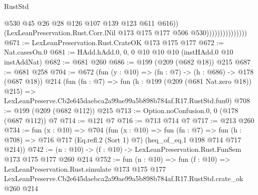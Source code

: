 \begin{lexlean}{RustStd}
\begin{coremodule}
                                    @530
                                    @45
                                    @26
                                    @28
                                    @126
                                    @107
                                    @139
                                    @123
                                    @611
                                    @616))
                                (LexLeanPreservation.Rust.Corr.lNil
                                  @173
                                  @175
                                  @177
                                  @506
                                  @530)))))))))))))))
@671 := LexLeanPreservation.Rust.CrateOK @173 @175 @177
@672 := Nat.casesOn.{0}
@681 := HAdd.hAdd.{0, 0, 0} @10 @10 @10 (instHAdd.{0} @10 instAddNat)
@682 := @681 @260
@686 := @199 (@209 (@682 @18)) @215
@687 := @681 @258
@704 := @672
    (fun (y : @10) => (fn : @7) -> (h : @686) -> @178 (@687 @18))
    @214
    (fun (fn : @7) =>
    fun (h : @199 (@209 (@681 Nat.zero @18)) @215) =>
    LexLeanPreserve.Cb2e645daebca2a99ae99a5b898b784af.R17.RustStd.fun0)
@708 := @199 (@209 (@682 @112)) @215
@713 := Option.noConfusion.{0, 0} (@178 (@687 @112)) @7
@714 := @121 @7
@716 := @713 @714 @7
@717 := @213 @260
@734 := fun (x : @10) =>
  @704
    (fun (x : @10) =>
    fun (fn : @7) =>
    fun (h : @708) => @716 @717 (Eq.refl.{2} (Sort 1) @7) (heq_of_eq.{1} @198 @714 @717 @214))
@742 := (n : @10) -> (f : @10) -> LexLeanPreservation.Rust.FunSem @173 @175 @177 @260 @214
@752 := fun (n : @10) =>
  fun (f : @10) =>
  LexLeanPreservation.Rust.simulate
    @173
    @175
    @177
    LexLeanPreserve.Cb2e645daebca2a99ae99a5b898b784af.R17.RustStd.crate_ok
    @260
    @214
\end{coremodule}
\end{lexlean}
